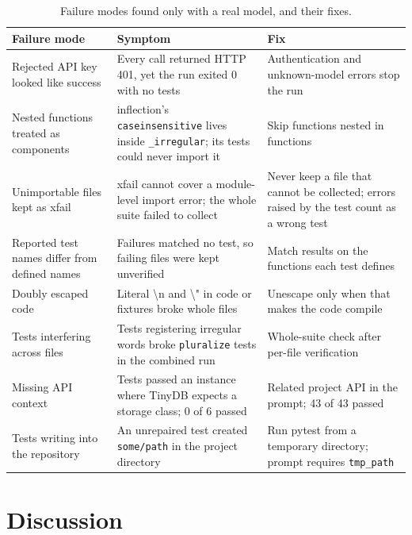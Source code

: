 \documentclass[11pt]{article}
\newcommand{\code}[1]{\texttt{#1}}
\begin{document}
\begin{table}[t]
\centering
\small
\caption{Failure modes found only with a real model, and their fixes.}
\label{tab:failures}
\begin{tabularx}{\linewidth}{@{}L L L@{}}
\toprule
Failure mode & Symptom & Fix \\
\midrule
Rejected API key looked like success & Every call returned HTTP 401, yet the run exited 0 with no tests & Authentication and unknown-model errors stop the run \\
Nested functions treated as components & inflection's \code{caseinsensitive} lives inside \code{\_irregular}; its tests could never import it & Skip functions nested in functions \\
Unimportable files kept as xfail & xfail cannot cover a module-level import error; the whole suite failed to collect & Never keep a file that cannot be collected; errors raised by the test count as a wrong test \\
Reported test names differ from defined names & Failures matched no test, so failing files were kept unverified & Match results on the functions each test defines \\
Doubly escaped code & Literal \textbackslash n and \textbackslash" in code or fixtures broke whole files & Unescape only when that makes the code compile \\
Tests interfering across files & Tests registering irregular words broke \code{pluralize} tests in the combined run & Whole-suite check after per-file verification \\
Missing API context & Tests passed an instance where TinyDB expects a storage class; 0 of 6 passed & Related project API in the prompt; 43 of 43 passed \\
Tests writing into the repository & An unrepaired test created \code{some/path} in the project directory & Run pytest from a temporary directory; prompt requires \code{tmp\_path} \\
\bottomrule
\end{tabularx}
\end{table}

\section{Discussion}\label{sec:discussion}
\end{document}
